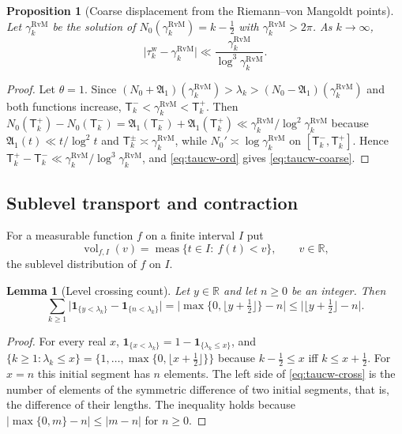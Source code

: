 \documentclass[11pt,a4paper]{article}
\numberwithin{equation}{section}
\newtheorem{proposition}[theorem]{Proposition}
\newtheorem{lemma}[theorem]{Lemma}
\theoremstyle{definition}
\theoremstyle{remark}
\newcommand{\meas}{\operatorname{meas}}
\newcommand{\ind}{\mathbf 1}
\newcommand{\vol}{\operatorname{vol}}
\begin{document}
\begin{proposition}[Coarse displacement from the Riemann--von Mangoldt points]\label{prop:taucw-coarse}
Let $\gamma_k^{\mathrm{RvM}}$ be the solution of $N_0(\gamma_k^{\mathrm{RvM}})=k-\frac12$ with $\gamma_k^{\mathrm{RvM}}>2\pi$. As $k\to\infty$,
\begin{equation}\label{eq:taucw-coarse}
\bigl|\tau_k^{\mathrm w}-\gamma_k^{\mathrm{RvM}}\bigr|\ll\frac{\gamma_k^{\mathrm{RvM}}}{\log^3\gamma_k^{\mathrm{RvM}}}.
\end{equation}
\end{proposition}
\begin{proof}
Let $\theta=1$. Since $(N_0+\mathfrak A_1)(\gamma_k^{\mathrm{RvM}})>\lambda_k>(N_0-\mathfrak A_1)(\gamma_k^{\mathrm{RvM}})$ and both functions increase, $\mathsf T_k^-<\gamma_k^{\mathrm{RvM}}<\mathsf T_k^+$. Then $N_0(\mathsf T_k^+)-N_0(\mathsf T_k^-)=\mathfrak A_1(\mathsf T_k^-)+\mathfrak A_1(\mathsf T_k^+)\ll\gamma_k^{\mathrm{RvM}}/\log^2\gamma_k^{\mathrm{RvM}}$ because $\mathfrak A_1(t)\ll t/\log^2t$ and $\mathsf T_k^\pm\asymp\gamma_k^{\mathrm{RvM}}$, while $N_0'\asymp\log\gamma_k^{\mathrm{RvM}}$ on $[\mathsf T_k^-,\mathsf T_k^+]$. Hence $\mathsf T_k^+-\mathsf T_k^-\ll\gamma_k^{\mathrm{RvM}}/\log^3\gamma_k^{\mathrm{RvM}}$, and \eqref{eq:taucw-ord} gives \eqref{eq:taucw-coarse}.
\end{proof}

\subsection{Sublevel transport and contraction}\label{sec:taucw-transport}
For a measurable function $f$ on a finite interval $I$ put
\begin{equation}\label{eq:taucw-vol}
\vol_{f,I}(v)=\meas\{t\in I:\ f(t)<v\},\qquad v\in\mathbb R,
\end{equation}
the sublevel distribution of $f$ on $I$.

\begin{lemma}[Level crossing count]\label{lem:taucw-cross}
Let $y\in\mathbb R$ and let $n\ge0$ be an integer. Then
\begin{equation}\label{eq:taucw-cross}
\sum_{k\ge1}\bigl|\ind_{\{y<\lambda_k\}}-\ind_{\{n<\lambda_k\}}\bigr|=\bigl|\max\{0,\lfloor y+\tfrac12\rfloor\}-n\bigr|\le\bigl|\lfloor y+\tfrac12\rfloor-n\bigr|.
\end{equation}
\end{lemma}
\begin{proof}
For every real $x$, $\ind_{\{x<\lambda_k\}}=1-\ind_{\{\lambda_k\le x\}}$, and $\{k\ge1:\lambda_k\le x\}=\{1,\dots,\max\{0,\lfloor x+\frac12\rfloor\}\}$ because $k-\frac12\le x$ iff $k\le x+\frac12$. For $x=n$ this initial segment has $n$ elements. The left side of \eqref{eq:taucw-cross} is the number of elements of the symmetric difference of two initial segments, that is, the difference of their lengths. The inequality holds because $|\max\{0,m\}-n|\le|m-n|$ for $n\ge0$.
\end{proof}
\end{document}
